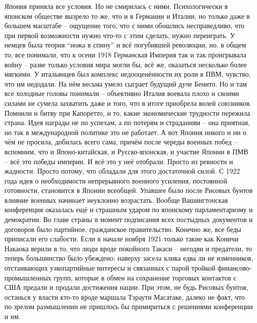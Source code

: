 Япония приняла все условия. Но не смирилась с ними. Психологически в японском обществе вызрело то же, что и в Германии и Италии, но только даже в большем масштабе – ощущение того, что с ними обошлись несправедливо, что при первой возможности нужно что-то с этим сделать, нужно переиграть. У немцев была теория “ножа в спину” и всё погубившей революции, но, в общем то, все понимали, что к осени 1918 Германская Империя так и так проигрывала войну – разве только условия мира могли бы, всё же, оказаться несколько более мягкими. У итальянцев был комплекс недооценённости их роли в ПВМ, чувство, что им недодали. На нём весьма умело сыграет будущий дуче Бенито. Но и там все холодные головы понимали – объективно Италия воевала плохо и своими силами не сумела захватить даже и того, что в итоге приобрела волей союзников. Помнили и битву при Капоретто, и то, какие экономические трудности пережила страна. Идея награды не по успехам, а по потерям и страданиям – она приятная, но так в международной политике это не работает. А вот Япония никого и ни о чём не просила, добилась всего сама, причём после череды военных побед – вспомним, что и Японо-китайская, и Русско-японская, и участие Японии в ПМВ – всё это победы империи. И всё это у неё отобрали. Просто из ревности и жадности. Просто потому, что обладали для этого достаточной силой. С 1922 года идея о необходимости непрерывного военного усиления, постоянной готовности, становится в Японии всеобщей. Упавшее было после Рисовых бунтов влияние военных начинает неуклонно возрастать. Вообще Вашингтонская конференция оказалась ещё и страшным ударом по японскому парламентаризму и демократии. Во главе страны в момент подписания всех постыдных документов и договоров было партийное, гражданское правительство. Конечно же, все беды приписали его слабости. Если в начале ноября 1921 только такие как Коничи Накаока верили в то, что люди вроде покойного Такаси – негодяи и предатели, то теперь большинство было убеждено: наверху засела клика едва ли не изменников, отстаивающих узкопартийные интересы и связанных с парой тройкой финансово-промышленных групп, которые в обмен на сохранение торговых контактов с США предали и продали достижения нации. При этом, не будь Рисовых бунтов, останься у власти кто-то вроде маршала Тэраути Масатаке, далеко не факт, что по зрелом размышлении не пришлось бы примириться с решениями конференции и им.


